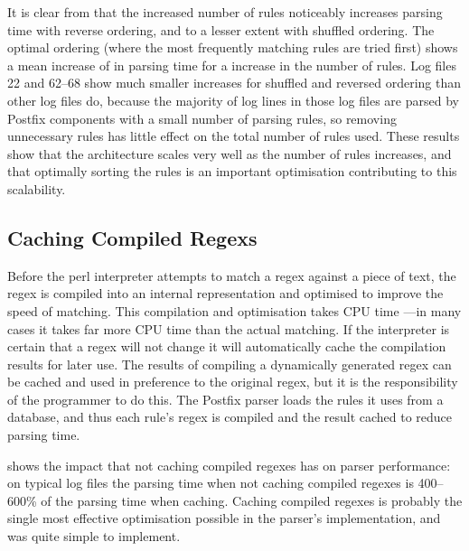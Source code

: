 
It is clear from  that the increased number of rules noticeably
increases parsing time with reverse ordering, and to a lesser extent with
shuffled ordering.  The optimal ordering (where the most frequently
matching rules are tried first) shows a mean increase of
 in parsing time for a
\numberOFrulesMAXIMUMpercentage{} increase in the number of rules.  Log
files 22 and 62--68 show much smaller increases for shuffled and reversed
ordering than other log files do, because the majority of log lines in
those log files are parsed by Postfix components with a small number of
parsing rules, so removing unnecessary rules has little effect on the total
number of rules used.  These results show that the architecture scales very
well as the number of rules increases, and that optimally sorting the rules
is an important optimisation contributing to this scalability.

\subsection{Caching Compiled Regexs}

\label{Caching compiled regexes}

Before the perl interpreter attempts to match a regex against a piece of
text, the regex is compiled into an internal representation and
optimised to improve the speed of matching.  This compilation and
optimisation takes CPU time ---in many cases it takes far more CPU time
than the actual matching.  If the interpreter is certain that a regex
will not change it will automatically cache the compilation results for
later use.   The results of compiling a dynamically generated regex can
be cached and used in preference to the original regex, but it is the
responsibility of the programmer to do this.  The Postfix parser loads the
rules it uses from a database, and thus each rule's regex is compiled
and the result cached to reduce parsing time.

shows the impact that not caching compiled regexes has on parser
performance: on typical log files the parsing time when not caching
compiled regexes is 400--600\% of the parsing time when caching.
Caching compiled regexes is probably the single most effective
optimisation possible in the parser's implementation, and was quite simple
to implement.

